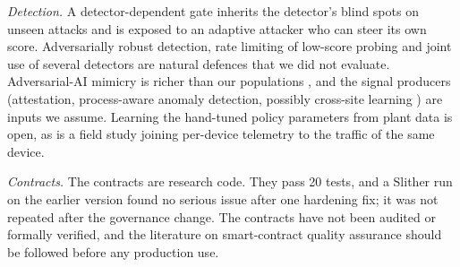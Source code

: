 \emph{Detection.} A detector-dependent gate inherits the detector's blind spots on unseen attacks and is exposed to an adaptive attacker who can steer its own score. Adversarially robust detection, rate limiting of low-score probing and joint use of several detectors are natural defences that we did not evaluate. Adversarial-AI mimicry is richer than our populations \cite{usama2026multilayer}, and the signal producers (attestation, process-aware anomaly detection, possibly cross-site learning \cite{tom2025flcti}) are inputs we assume. Learning the hand-tuned policy parameters from plant data \cite{salim2026ztblociot} is open, as is a field study joining per-device telemetry to the traffic of the same device.

\emph{Contracts.} The contracts are research code. They pass 20 tests, and a Slither run on the earlier version found no serious issue after one hardening fix; it was not repeated after the governance change. The contracts have not been audited or formally verified, and the literature on smart-contract quality assurance \cite{wei2024quality} should be followed before any production use.
